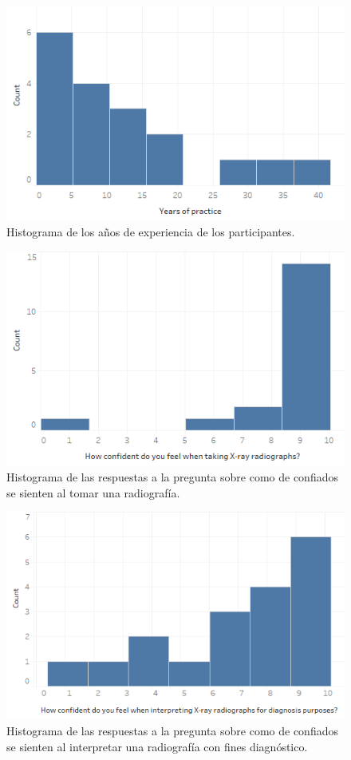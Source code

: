 \begin{figure}[h]
        \centering
        \includegraphics[width=0.75\linewidth]{IMG/years.png}
        {
         \caption{\label{fig:year}Histograma de los años de experiencia de los participantes.}
        }
       
    \end{figure}
     \begin{figure}[h]
        \centering
        \includegraphics[width=0.75\linewidth]{IMG/confident.png}{
        
        \caption{\label{fig:confident}Histograma de las respuestas a la pregunta sobre como de confiados se sienten al tomar una radiografía.}
        }
    \end{figure}
   
     \begin{figure}[h]
        \centering
        \includegraphics[width=0.75\linewidth]{IMG/interpreting.png}{
        \caption{\label{fig:interpreting}Histograma de las respuestas a la pregunta sobre como de confiados se sienten al interpretar una radiografía con fines diagnóstico.}
        }
    \end{figure}


